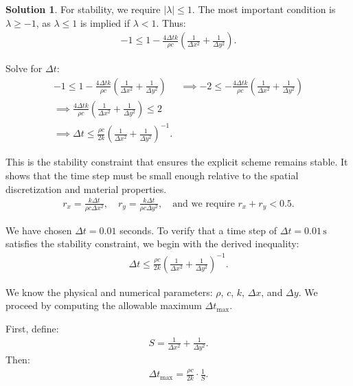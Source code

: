 \documentclass[12pt]{article}
\theoremstyle{definition} %
\newtheorem{solution}{Solution}
\theoremstyle{plain} %
\begin{document}
\begin{solution}
\noindent For stability, we require $|\lambda| \leq 1$. The most important condition is $\lambda \geq -1$, as $\lambda \leq 1$ is implied if $\lambda < 1$. Thus:
\begin{align}
-1 \leq 1 - \frac{4\Delta t k}{\rho c}\left( \frac{1}{\Delta x^2} + \frac{1}{\Delta y^2} \right).
\end{align}

\noindent Solve for $\Delta t$:
\begin{align*}
-1 \leq 1 - \frac{4\Delta t k}{\rho c}\left( \frac{1}{\Delta x^2} + \frac{1}{\Delta y^2} \right) &\implies -2 \leq - \frac{4\Delta t k}{\rho c}\left( \frac{1}{\Delta x^2} + \frac{1}{\Delta y^2}\right) \\
\implies \frac{4 \Delta t k}{\rho c}\left( \frac{1}{\Delta x^2} + \frac{1}{\Delta y^2}\right) \leq 2 \\
\implies \Delta t \leq \frac{\rho c}{2k}\left(\frac{1}{\Delta x^2} + \frac{1}{\Delta y^2}\right)^{-1}.
\end{align*}

\noindent This is the stability constraint that ensures the explicit scheme remains stable. It shows that the time step must be small enough relative to the spatial discretization and material properties.
            \begin{align}
            r_x = \frac{k \Delta t}{\rho c \Delta x^2}, \quad r_y = \frac{k \Delta t}{\rho c \Delta y^2}, \quad \text{and we require } r_x + r_y < 0.5.
            \end{align}
        
            \noindent We have chosen $\Delta t = 0.01$ seconds. To verify that a time step of $\Delta t = 0.01\,\text{s}$ satisfies the stability constraint, we begin with the derived inequality:
            \begin{align}
            \Delta t \leq \frac{\rho c}{2k} \left( \frac{1}{\Delta x^2} + \frac{1}{\Delta y^2} \right)^{-1}.
            \end{align}
            
            \noindent We know the physical and numerical parameters: $\rho$, $c$, $k$, $\Delta x$, and $\Delta y$. We proceed by computing the allowable maximum $\Delta t_{\max}$.
            
            First, define:
            \begin{align}
            S = \frac{1}{\Delta x^2} + \frac{1}{\Delta y^2}.
            \end{align}
            Then:
            \begin{align}
            \Delta t_{\max} = \frac{\rho c}{2k}\cdot \frac{1}{S}.
            \end{align}
            

\end{solution}
\end{document}
